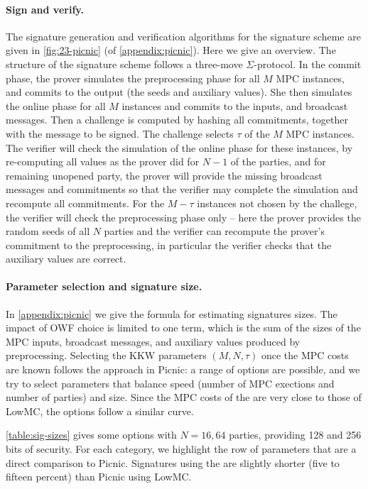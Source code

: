 \paragraph{Sign and verify.} 
The signature generation and verification algorithms for the
\ttOWF  signature scheme are given in \cref{fig:23-picnic} (of \cref{appendix:picnic}).
Here we give an overview. The structure of
the signature scheme follows a three-move $\Sigma$-protocol. In the commit phase, the
prover simulates the preprocessing phase for all $M$ MPC instances, and commits
to the output (the seeds and auxiliary values).  She then simulates the online
phase for all $M$ instances and commits to the inputs, and broadcast messages.
Then a challenge is computed by hashing all commitments, together with the
message to be signed.  The challenge selects $\tau$ of the $M$ MPC instances.
The verifier will check the simulation of the online phase for these instances,
by re-computing all values as the prover did for $N-1$ of the parties, and for
remaining unopened party, the prover will provide the missing broadcast messages
and commitments so that the verifier may complete the simulation and recompute all
commitments. 
For the $M-\tau$ instances not chosen by the challege, the verifier will check
the preprocessing phase only -- here the prover provides the random seeds of
all $N$ parties and the verifier can recompute the prover's commitment to the
preprocessing, in particular the verifier checks that the auxiliary values are
correct.

\newcommand{\textunderbrace}[2]{{%
  \underbrace{#1}_{\text{#2}}
}}

\paragraph{Parameter selection and signature size.}
In \cref{appendix:picnic} we give the formula for estimating signatures sizes.
The impact of OWF choice is limited to one term, which is the sum of
the sizes of the MPC inputs, broadcast messages, and auxiliary values produced
by preprocessing.  Selecting the KKW parameters $(M, N, \tau)$ once the MPC costs
are known follows the approach in Picnic: a range of options are possible, and
we try to select parameters that balance speed (number of MPC exections and number of 
parties) and size.  Since the MPC costs of the \ttOWF are very close to those
of LowMC, the options follow a similar curve. 

\cref{table:sig-sizes} gives some options with $N=16, 64$ parties,
providing 128 and 256 bits of security. For each category, we highlight the row
of \ttOWF parameters that are a direct comparison to Picnic.  Signatures using
the \ttOWF are slightly shorter (five to fifteen percent) than Picnic using
LowMC. 


